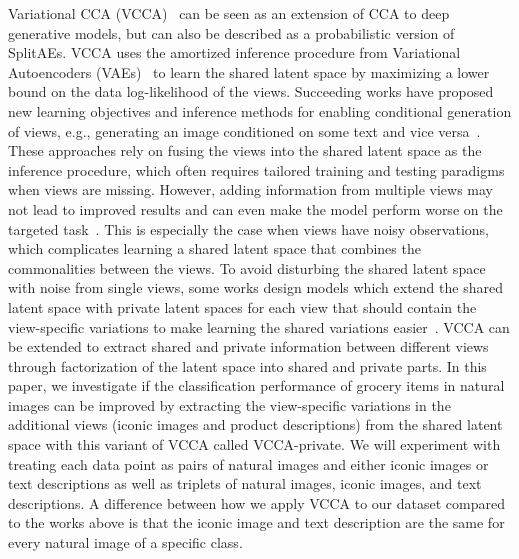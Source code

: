 Variational CCA (VCCA)~ can be seen as an extension of CCA to deep generative models, but can also be described as a probabilistic version of SplitAEs.
VCCA uses the amortized inference procedure from Variational Autoencoders (VAEs)~ to learn the shared latent space by maximizing a lower bound on the data log-likelihood of the views. Succeeding works have proposed new learning objectives and inference methods for enabling conditional generation of views, e.g., generating an image conditioned on some text and vice versa~. These approaches rely on fusing the views into the shared latent space as the inference procedure, which often requires tailored training and testing paradigms when views are missing. However, adding information from multiple views may not lead to improved results and can even make the model perform worse on the targeted task~. This is especially the case when views have noisy observations, which complicates learning a shared latent space that combines the commonalities between the views. To avoid disturbing the shared latent space with noise from single views, some works design models which extend the shared latent space with private latent spaces for each view that should contain the view-specific variations to make learning the shared variations easier~. VCCA can be extended to extract shared and private information between different views through factorization of the latent space into shared and private parts. In this paper, we investigate if the classification performance of grocery items in natural images can be improved by extracting the view-specific variations in the additional views (iconic images and product descriptions) from the shared latent space with this variant of VCCA called VCCA-private. We will experiment with treating each data point as pairs of natural images and either iconic images or text descriptions as well as triplets of natural images, iconic images, and text descriptions.
A difference between how we apply VCCA to our dataset compared to the works above is that the iconic image and text description are the same for every natural image of a specific class.  



